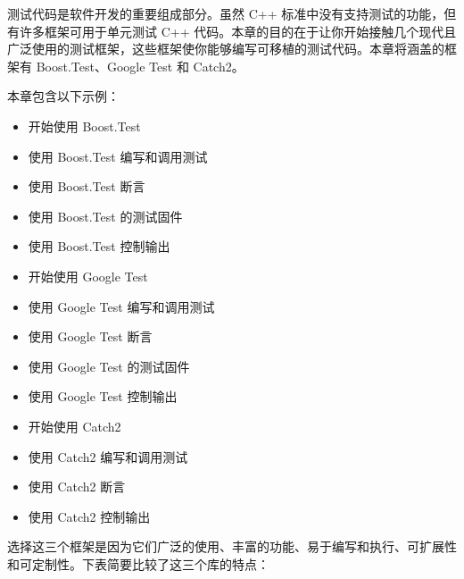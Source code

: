 测试代码是软件开发的重要组成部分。虽然 C++ 标准中没有支持测试的功能，但有许多框架可用于单元测试 C++ 代码。本章的目的在于让你开始接触几个现代且广泛使用的测试框架，这些框架使你能够编写可移植的测试代码。本章将涵盖的框架有 Boost.Test、Google Test 和 Catch2。

本章包含以下示例：

\begin{itemize}
\item
开始使用 Boost.Test

\item
使用 Boost.Test 编写和调用测试

\item
使用 Boost.Test 断言

\item
使用 Boost.Test 的测试固件

\item
使用 Boost.Test 控制输出

\item
开始使用 Google Test

\item
使用 Google Test 编写和调用测试

\item
使用 Google Test 断言

\item
使用 Google Test 的测试固件

\item
使用 Google Test 控制输出

\item
开始使用 Catch2

\item
使用 Catch2 编写和调用测试

\item
使用 Catch2 断言

\item
使用 Catch2 控制输出
\end{itemize}

选择这三个框架是因为它们广泛的使用、丰富的功能、易于编写和执行、可扩展性和可定制性。下表简要比较了这三个库的特点：

